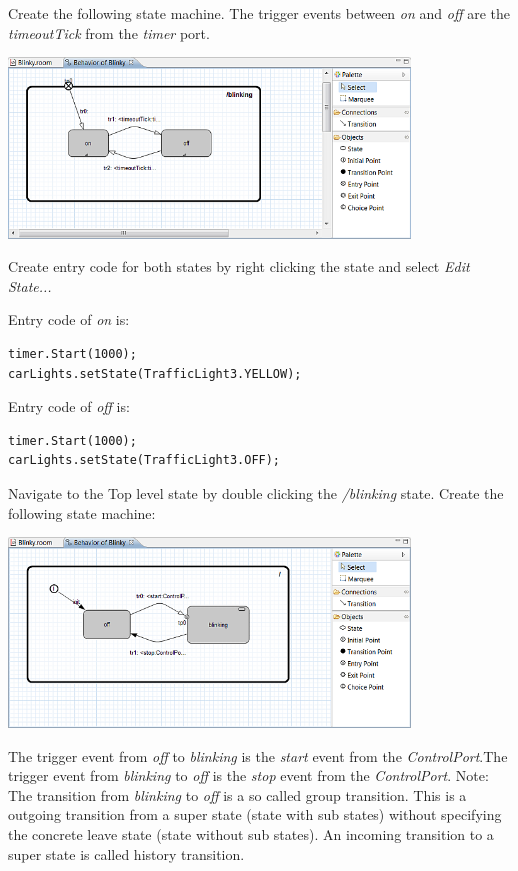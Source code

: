 Create the following state machine. The trigger events between \textit{on} and \textit{off} are the 
\textit{timeoutTick} from the \textit{timer} port. 

\includegraphics[width=0.8\textwidth]{images/020-Blinky14.png}

Create entry code for both states by right clicking the state and select \textit{Edit State...}

Entry code of \textit{on} is:

\begin{verbatim}
timer.Start(1000);
carLights.setState(TrafficLight3.YELLOW); 
\end{verbatim}

 
Entry code  of \textit{off} is:

\begin{verbatim}
timer.Start(1000);
carLights.setState(TrafficLight3.OFF);
\end{verbatim}

Navigate to the Top level state by double clicking the \textit{/blinking} state. Create the following 
state machine:

\includegraphics[width=0.8\textwidth]{images/020-Blinky15.png}

The trigger event from \textit{off} to \textit{blinking} is the \textit{start} event from the 
\textit{ControlPort}.The trigger event from \textit{blinking} to \textit{off} is the \textit{stop} event 
from the \textit{ControlPort}.
Note: The transition from \textit{blinking} to \textit{off} is a so called group transition. This is a 
outgoing transition from a super state (state with sub states) without specifying the concrete leave state 
(state without sub states). An incoming transition to a super state is called history transition.   

